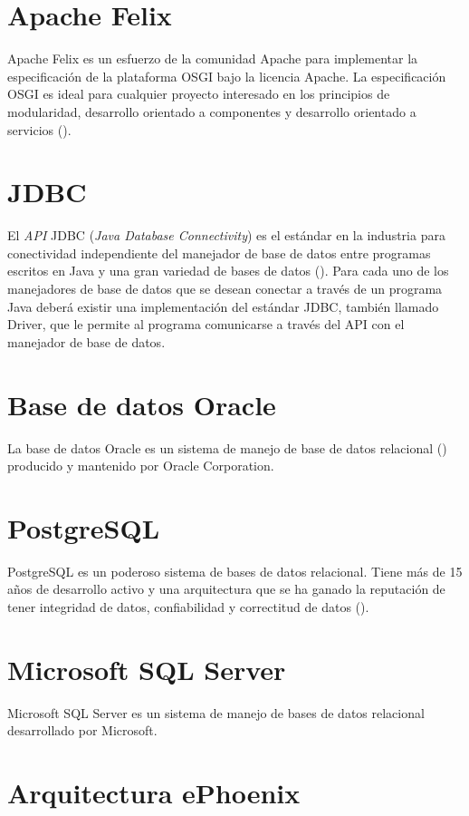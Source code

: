 \section{Apache Felix}

Apache Felix es un esfuerzo de la comunidad Apache para implementar la especificación de
la plataforma OSGI bajo la licencia Apache. La especificación OSGI es ideal para
cualquier proyecto interesado en los principios de modularidad, desarrollo orientado
a componentes y desarrollo orientado a servicios (\cite{FELIX}).

\section{JDBC}

El \emph{API} JDBC (\emph{Java Database Connectivity}) es el estándar en la industria
para conectividad independiente del manejador de base de datos entre programas escritos en
Java y una gran variedad de bases de datos (\cite{JDBC}). Para cada uno de los manejadores
de base de datos que se desean conectar a través de un programa Java deberá existir una implementación
del estándar JDBC, también llamado Driver, que le permite al programa comunicarse a través del
API con el manejador de base de datos.

\section{Base de datos Oracle}

La base de datos Oracle es un sistema de manejo de base de datos relacional (\cite{ORACLE})
producido y mantenido por Oracle Corporation.

\section{PostgreSQL}

PostgreSQL es un poderoso sistema de bases de datos relacional. Tiene más de
15 años de desarrollo activo y una arquitectura que se ha ganado la reputación de tener
integridad de datos, confiabilidad y correctitud de datos (\cite{POSTGRE}).

\section{Microsoft SQL Server}
Microsoft SQL Server es un sistema de manejo de bases de datos relacional desarrollado por
Microsoft.

\section{Arquitectura ePhoenix}


